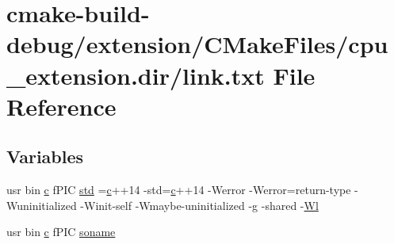 \hypertarget{extension_2CMakeFiles_2cpu__extension_8dir_2link_8txt}{}\section{cmake-\/build-\/debug/extension/\+C\+Make\+Files/cpu\+\_\+extension.dir/link.txt File Reference}
\label{extension_2CMakeFiles_2cpu__extension_8dir_2link_8txt}
\subsection*{Variables}
\begin{DoxyCompactItemize}
\item 
usr bin \hyperlink{CMakeCache_8txt_aac1d6a1710812201527c735f7c6afbaa}{c} f\+P\+IC \hyperlink{extension_2CMakeFiles_2cpu__extension_8dir_2link_8txt_a5f87c8f8e33670f7c8c5221b6be1bcc4}{std} =\hyperlink{CMakeCache_8txt_aac1d6a1710812201527c735f7c6afbaa}{c}++14 -\/std=\hyperlink{CMakeCache_8txt_aac1d6a1710812201527c735f7c6afbaa}{c}++14 -\/Werror -\/Werror=return-\/type -\/Wuninitialized -\/Winit-\/self -\/Wmaybe-\/uninitialized -\/g -\/shared -\/\hyperlink{thirdparty_2extension_2CMakeFiles_2cpu__extension_8dir_2link_8txt_af9ccbf658ed2deb89d0d79f211e5b033}{Wl}
\item 
usr bin \hyperlink{CMakeCache_8txt_aac1d6a1710812201527c735f7c6afbaa}{c} f\+P\+IC \hyperlink{extension_2CMakeFiles_2cpu__extension_8dir_2link_8txt_ab65a9b6457c4853ed17f89f945516e66}{soname}
\item 

\end{DoxyCompactItemize}
